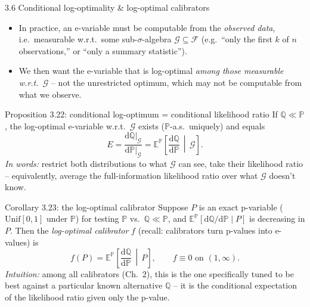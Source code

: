 \documentclass[aspectratio=169,10pt]{beamer}
\newcommand{\PP}{\mathbb{P}}
\newcommand{\QQ}{\mathbb{Q}}
\newcommand{\EE}{\mathbb{E}}
\newcommand{\calF}{\mathcal{F}}
\newcommand{\calG}{\mathcal{G}}
\begin{document}
\begin{frame}[allowframebreaks]{3.6 Conditional log-optimality \& log-optimal calibrators}
  \begin{itemize}
    \item In practice, an e-variable must be computable from the \emph{observed data}, i.e.\ measurable w.r.t.\ some sub-$\sigma$-algebra $\calG\subseteq\calF$ (e.g.\ ``only the first $k$ of $n$ observations,'' or ``only a summary statistic'').
    \item We then want the e-variable that is log-optimal \emph{among those measurable w.r.t.\ $\calG$} -- not the unrestricted optimum, which may not be computable from what we observe.
  \end{itemize}

  \begin{block}{Proposition 3.22: conditional log-optimum = conditional likelihood ratio}
    If $\QQ\ll\PP$, the log-optimal e-variable w.r.t.\ $\calG$ exists ($\PP$-a.s.\ uniquely) and equals
    \[
      E = \frac{\mathrm{d}\QQ|_\calG}{\mathrm{d}\PP|_\calG} = \EE^\PP\!\left[\frac{\mathrm{d}\QQ}{\mathrm{d}\PP} \,\middle|\, \calG\right].
    \]
    \emph{In words:} restrict both distributions to what $\calG$ can see, take their likelihood ratio -- equivalently, average the full-information likelihood ratio over what $\calG$ doesn't know.
  \end{block}

  \begin{block}{Corollary 3.23: the log-optimal calibrator}
    Suppose $P$ is an exact p-variable ($\mathrm{Unif}[0,1]$ under $\PP$) for testing $\PP$ vs.\ $\QQ\ll\PP$, and $\EE^\PP[\mathrm{d}\QQ/\mathrm{d}\PP \mid P]$ is decreasing in $P$. Then the \emph{log-optimal calibrator} $f$ (recall: calibrators turn p-values into e-values) is
    \[
      f(P) = \EE^\PP\!\left[\frac{\mathrm{d}\QQ}{\mathrm{d}\PP} \,\middle|\, P\right], \qquad f\equiv 0 \text{ on } (1,\infty).
    \]
    \emph{Intuition:} among all calibrators (Ch.\ 2), this is the one specifically tuned to be best against a particular known alternative $\QQ$ -- it is the conditional expectation of the likelihood ratio given only the p-value.
  \end{block}
\end{frame}
\end{document}
